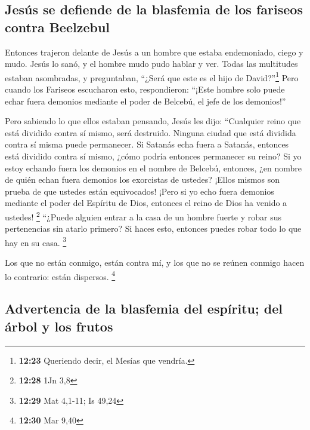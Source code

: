 \hypertarget{jesuxfas-se-defiende-de-la-blasfemia-de-los-fariseos-contra-beelzebul}{%
\subsection{Jesús se defiende de la blasfemia de los fariseos contra
Beelzebul}\label{jesuxfas-se-defiende-de-la-blasfemia-de-los-fariseos-contra-beelzebul}}

 Entonces trajeron delante de Jesús a un hombre que
estaba endemoniado, ciego y mudo. Jesús lo sanó, y el hombre mudo pudo
hablar y ver.  Todas las multitudes estaban asombradas, y
preguntaban, ``¿Será que este es el hijo de David?''\footnote{\textbf{12:23}
  Queriendo decir, el Mesías que vendría.}  Pero cuando
los Fariseos escucharon esto, respondieron: ``¡Este hombre solo puede
echar fuera demonios mediante el poder de Belcebú, el jefe de los
demonios!''

 Pero sabiendo lo que ellos estaban pensando, Jesús les
dijo: ``Cualquier reino que está dividido contra sí mismo, será
destruido. Ninguna ciudad que está dividida contra sí misma puede
permanecer.  Si Satanás echa fuera a Satanás, entonces
está dividido contra sí mismo, ¿cómo podría entonces permanecer su
reino?  Si yo estoy echando fuera los demonios en el
nombre de Belcebú, entonces, ¿en nombre de quién echan fuera demonios
los exorcistas de ustedes? ¡Ellos mismos son prueba de que ustedes están
equivocados!  ¡Pero si yo echo fuera demonios mediante el
poder del Espíritu de Dios, entonces el reino de Dios ha venido a
ustedes! \footnote{\textbf{12:28} 1Jn 3,8}  ``¿Puede
alguien entrar a la casa de un hombre fuerte y robar sus pertenencias
sin atarlo primero? Si haces esto, entonces puedes robar todo lo que hay
en su casa. \footnote{\textbf{12:29} Mat 4,1-11; Is 49,24}

 Los que no están conmigo, están contra mí, y los que no
se reúnen conmigo hacen lo contrario: están dispersos. \footnote{\textbf{12:30}
  Mar 9,40}

\hypertarget{advertencia-de-la-blasfemia-del-espuxedritu-del-uxe1rbol-y-los-frutos}{%
\subsection{Advertencia de la blasfemia del espíritu; del árbol y los
frutos}\label{advertencia-de-la-blasfemia-del-espuxedritu-del-uxe1rbol-y-los-frutos}}

